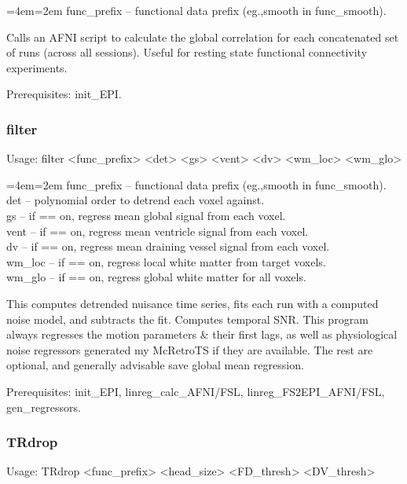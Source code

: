 \documentclass[final,titlepage,letterpaper,oneside,12pt]{article}
\renewcommand{\texttt}[2][BrickRed]{\textcolor{#1}{\ttfamily #2}}%
\newenvironment{blockquote}{%
  \par%
  \medskip
  \leftskip=4em\rightskip=2em%
  \noindent\ignorespaces}{%
  \par\medskip}
\begin{document}
\begin{blockquote}
func\_prefix -- functional data prefix (eg.,smooth in func\_smooth).
\end{blockquote}

\noindent Calls an AFNI script to calculate the global correlation for each concatenated set of runs (across all sessions). Useful for resting state functional connectivity experiments.

Prerequisites: \texttt{init\_EPI}.

\subsubsection{filter}
Usage: \texttt{filter <func\_prefix> <det> <gs> <vent> <dv> <wm\_loc> <wm\_glo>}

\begin{blockquote}
func\_prefix -- functional data prefix (eg.,smooth in func\_smooth). \\
det -- polynomial order to detrend each voxel against. \\
gs -- if == on, regress mean global signal from each voxel. \\
vent -- if == on, regress mean ventricle signal from each voxel. \\
dv -- if == on, regress mean draining vessel signal from each voxel. \\
wm\_loc -- if == on, regress local white matter from target voxels. \\
wm\_glo -- if == on, regress global white matter for all voxels. \

\end{blockquote}

\noindent This computes detrended nuisance time series, fits each run with a computed noise model, and subtracts the fit. Computes temporal SNR. This program always regresses the motion parameters \& their first lags, as well as physiological noise regressors generated my McRetroTS if they are available. The rest are optional, and generally advisable save global mean regression.

Prerequisites: \texttt{init\_EPI}, \texttt{linreg\_calc\_AFNI/FSL}, \texttt{linreg\_FS2EPI\_AFNI/FSL}, \texttt{gen\_regressors}.

\subsubsection{TRdrop}
Usage: \texttt{TRdrop <func\_prefix> <head\_size> <FD\_thresh> <DV\_thresh>}
\end{document}
